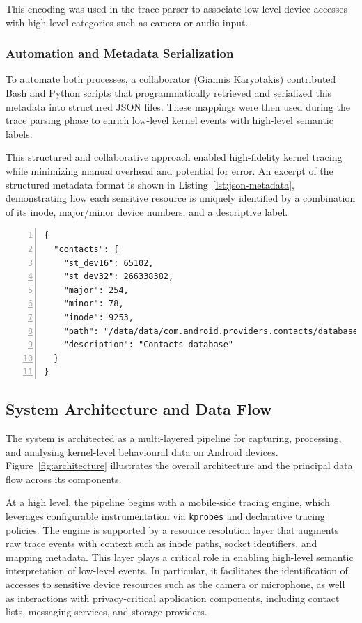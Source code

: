 \documentclass[a4paper,12pt]{report}
\begin{document}
This encoding was used in the trace parser to associate low-level device accesses with high-level categories such as camera or audio input.

\subsubsection{Automation and Metadata Serialization}

To automate both processes, a collaborator (Giannis Karyotakis) contributed Bash and Python scripts that programmatically retrieved and serialized this metadata into structured JSON files. These mappings were then used during the trace parsing phase to enrich low-level kernel events with high-level semantic labels.

This structured and collaborative approach enabled high-fidelity kernel tracing while minimizing manual overhead and potential for error.
An excerpt of the structured metadata format is shown in Listing~\ref{lst:json-metadata}, demonstrating how each sensitive resource is uniquely identified by a combination of its inode, major/minor device numbers, and a descriptive label.

\begin{lstlisting}[caption={Serialized JSON metadata for sensitive resource mapping},label={lst:json-metadata},numbers=left]
{
  "contacts": {
    "st_dev16": 65102,
    "st_dev32": 266338382,
    "major": 254,
    "minor": 78,
    "inode": 9253,
    "path": "/data/data/com.android.providers.contacts/databases/contacts2.db",
    "description": "Contacts database"
  }
}
\end{lstlisting}

\subsection{System Architecture and Data Flow}

The system is architected as a multi-layered pipeline for capturing, processing, and analysing kernel-level behavioural data on Android devices. Figure~\ref{fig:architecture} illustrates the overall architecture and the principal data flow across its components.

At a high level, the pipeline begins with a mobile-side tracing engine, which leverages configurable instrumentation via \texttt{kprobes} and declarative tracing policies. The engine is supported by a resource resolution layer that augments raw trace events with context such as inode paths, socket identifiers, and mapping metadata. This layer plays a critical role in enabling high-level semantic interpretation of low-level events. In particular, it facilitates the identification of accesses to sensitive device resources such as the camera or microphone, as well as interactions with privacy-critical application components, including contact lists, messaging services, and storage providers.
\end{document}
